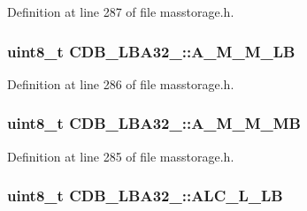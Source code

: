 \-Definition at line 287 of file masstorage.\-h.

\hypertarget{struct_c_d_b___l_b_a32__16_afe7168380c8e629cc53432938b47f1f1}{
\subsubsection[{\-A\-\_\-\-M\-\_\-\-M\-\_\-\-L\-B}]{\setlength{\rightskip}{0pt plus 5cm}uint8\-\_\-t {\bf \-C\-D\-B\-\_\-\-L\-B\-A32\-\_\-::\-A\-\_\-\-M\-\_\-\-M\-\_\-\-L\-B}}}\label{struct_c_d_b___l_b_a32__16_afe7168380c8e629cc53432938b47f1f1}


\-Definition at line 286 of file masstorage.\-h.

\hypertarget{struct_c_d_b___l_b_a32__16_aceab9e7479ff5e3a7ea449a97a6e26e2}{
\subsubsection[{\-A\-\_\-\-M\-\_\-\-M\-\_\-\-M\-B}]{\setlength{\rightskip}{0pt plus 5cm}uint8\-\_\-t {\bf \-C\-D\-B\-\_\-\-L\-B\-A32\-\_\-::\-A\-\_\-\-M\-\_\-\-M\-\_\-\-M\-B}}}\label{struct_c_d_b___l_b_a32__16_aceab9e7479ff5e3a7ea449a97a6e26e2}


\-Definition at line 285 of file masstorage.\-h.

\hypertarget{struct_c_d_b___l_b_a32__16_a03d583e8bd99b2d196d734ffd0951fff}{
\subsubsection[{\-A\-L\-C\-\_\-\-L\-\_\-\-L\-B}]{\setlength{\rightskip}{0pt plus 5cm}uint8\-\_\-t {\bf \-C\-D\-B\-\_\-\-L\-B\-A32\-\_\-::\-A\-L\-C\-\_\-\-L\-\_\-\-L\-B}}}\label{struct_c_d_b___l_b_a32__16_a03d583e8bd99b2d196d734ffd0951fff}


